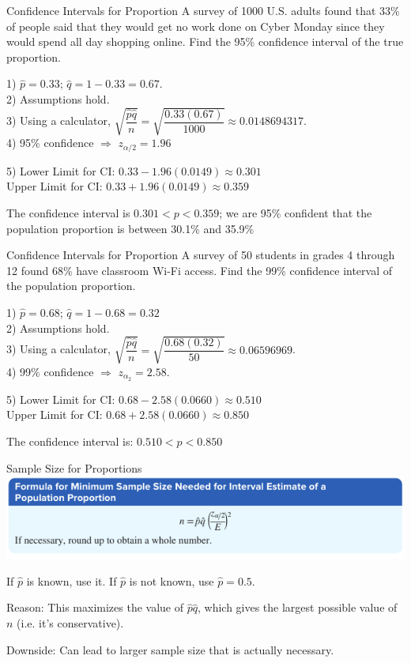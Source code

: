 \documentclass[t, aspectratio=169]{beamer}
\def\then{\Rightarrow}
\newcommand{\?}{\stackrel{?}{=}}
\begin{document}
	\begin{frame}{Confidence Intervals for Proportion}
		A survey of 1000 U.S. adults found that 33\% of people said that they would get no work done on Cyber Monday since they would spend all day shopping online. Find the 95\% confidence interval of the true proportion. \pause
		
		1) $\hat{p} = 0.33$; $\hat{q} = 1 - 0.33 = 0.67$. \pause \\
		2) Assumptions hold. \pause \\
		3) Using a calculator, $\sqrt{\dfrac{\hat{p}\hat{q}}{n}} = \sqrt{\dfrac{0.33(0.67)}{1000}} \approx 0.0148694317$. \pause \\
		4) 95\% confidence $\then$ $z_{\alpha / 2} = 1.96$ \pause
		
		5) Lower Limit for CI: $0.33 - 1.96(0.0149) \approx 0.301$ \pause \\
		Upper Limit for CI: $0.33 + 1.96(0.0149) \approx 0.359$ \pause
		
		The confidence interval is $0.301 < p < 0.359$\pause; we are 95\% confident that the population proportion is between 30.1\% and 35.9\%
	\end{frame}

	\begin{frame}{Confidence Intervals for Proportion}
		A survey of 50 students in grades 4 through 12 found 68\% have classroom Wi-Fi access. Find the 99\% confidence interval of the population proportion. \pause
		
		1) $\hat{p} = 0.68$; $\hat{q} = 1 - 0.68 = 0.32$ \pause \\
		2) Assumptions hold. \pause \\
		3) Using a calculator, $\sqrt{\dfrac{\hat{p}\hat{q}}{n}} = \sqrt{\dfrac{0.68(0.32)}{50}} \approx 0.06596969$. \pause \\
		4) 99\% confidence $\then$ $z_{\alpha_2} = 2.58$. \pause
		
		5) Lower Limit for CI: $0.68 - 2.58(0.0660) \approx 0.510$ \pause \\
		Upper Limit for CI: $0.68 + 2.58(0.0660) \approx 0.850$ \pause
		
		The confidence interval is: $0.510 < p < 0.850$
	\end{frame}

	\begin{frame}{Sample Size for Proportions}
		\includegraphics[width=\textwidth]{sample.png} \pause
		
		If $\hat{p}$ is known, use it. If $\hat{p}$ is not known, use $\hat{p} = 0.5$. \pause
		
		Reason: This maximizes the value of $\hat{p}\hat{q}$, which gives the largest possible value of $n$ (i.e. it's conservative). \pause
		
		Downside: Can lead to larger sample size that is actually necessary.
	\end{frame}
\end{document}
